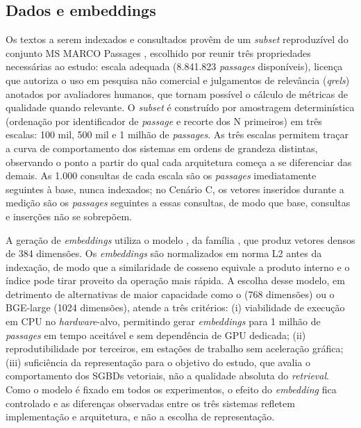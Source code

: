 \subsection{Dados e embeddings}
\label{sec:dados}

Os textos a serem indexados e consultados provêm de um \textit{subset} reproduzível do conjunto MS MARCO Passages \cite{bajaj2016msmarco}, escolhido por reunir três propriedades necessárias ao estudo: escala adequada (8.841.823 \textit{passages} disponíveis), licença que autoriza o uso em pesquisa não comercial e julgamentos de relevância (\textit{qrels}) anotados por avaliadores humanos, que tornam possível o cálculo de métricas de qualidade quando relevante. O \textit{subset} é construído por amostragem determinística (ordenação por identificador de \textit{passage} e recorte dos N primeiros) em três escalas: 100 mil, 500 mil e 1 milhão de \textit{passages}. As três escalas permitem traçar a curva de comportamento dos sistemas em ordens de grandeza distintas, observando o ponto a partir do qual cada arquitetura começa a se diferenciar das demais. As 1.000 consultas de cada escala são os \textit{passages} imediatamente seguintes à base, nunca indexados; no Cenário C, os vetores inseridos durante a medição são os \textit{passages} seguintes a essas consultas, de modo que base, consultas e inserções não se sobrepõem.

A geração de \textit{embeddings} utiliza o modelo , da família  \cite{reimers2019sbert}, que produz vetores densos de 384 dimensões. Os \textit{embeddings} são normalizados em norma L2 antes da indexação, de modo que a similaridade de cosseno equivale a produto interno e o índice pode tirar proveito da operação mais rápida. A escolha desse modelo, em detrimento de alternativas de maior capacidade como o  (768 dimensões) ou o BGE-large (1024 dimensões), atende a três critérios: (i) viabilidade de execução em CPU no \textit{hardware}-alvo, permitindo gerar \textit{embeddings} para 1 milhão de \textit{passages} em tempo aceitável e sem dependência de GPU dedicada; (ii) reprodutibilidade por terceiros, em estações de trabalho sem aceleração gráfica; (iii) suficiência da representação para o objetivo do estudo, que avalia o comportamento dos SGBDs vetoriais, não a qualidade absoluta do \textit{retrieval}. Como o modelo é fixado em todos os experimentos, o efeito do \textit{embedding} fica controlado e as diferenças observadas entre os três sistemas refletem implementação e arquitetura, e não a escolha de representação.

